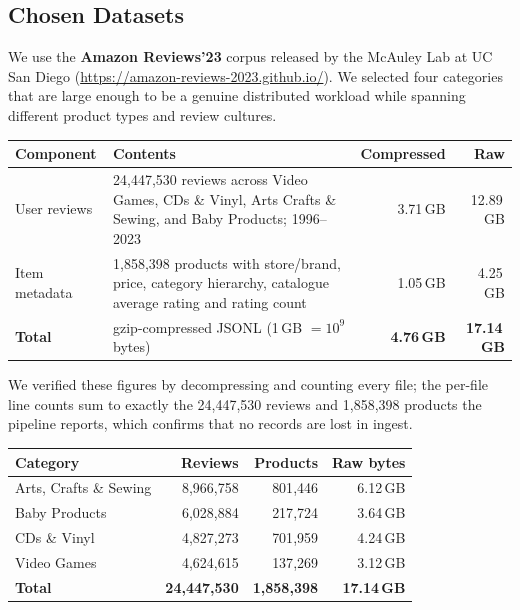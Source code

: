 \documentclass[12pt]{article}
\begin{document}
\subsection{Chosen Datasets}

We use the \textbf{Amazon Reviews'23} corpus released by the McAuley Lab at UC
San Diego (\url{https://amazon-reviews-2023.github.io/}). We selected four
categories that are large enough to be a genuine distributed workload while
spanning different product types and review cultures.

\begin{tabularx}{\textwidth}{@{}lXrr@{}}
  \toprule
  \textbf{Component} & \textbf{Contents} & \textbf{Compressed} & \textbf{Raw} \\
  \midrule
  User reviews &
    24{,}447{,}530 reviews across Video Games, CDs \& Vinyl, Arts Crafts \&
    Sewing, and Baby Products; 1996--2023 &
    3.71\,GB & 12.89\,GB \\
  Item metadata &
    1{,}858{,}398 products with store/brand, price, category hierarchy,
    catalogue average rating and rating count &
    1.05\,GB & 4.25\,GB \\
  \midrule
  \textbf{Total} & gzip-compressed JSONL (1\,GB $=10^9$ bytes)
    & \textbf{4.76\,GB} & \textbf{17.14\,GB} \\
  \bottomrule
\end{tabularx}

We verified these figures by decompressing and counting every file; the
per-file line counts sum to exactly the 24{,}447{,}530 reviews and
1{,}858{,}398 products the pipeline reports, which confirms that no records
are lost in ingest.

\begin{center}
\begin{tabular}{@{}lrrr@{}}
  \toprule
  \textbf{Category} & \textbf{Reviews} & \textbf{Products} &
  \textbf{Raw bytes} \\
  \midrule
  Arts, Crafts \& Sewing & 8{,}966{,}758 & 801{,}446 & 6.12\,GB \\
  Baby Products          & 6{,}028{,}884 & 217{,}724 & 3.64\,GB \\
  CDs \& Vinyl           & 4{,}827{,}273 & 701{,}959 & 4.24\,GB \\
  Video Games            & 4{,}624{,}615 & 137{,}269 & 3.12\,GB \\
  \midrule
  \textbf{Total}         & \textbf{24{,}447{,}530} & \textbf{1{,}858{,}398}
                         & \textbf{17.14\,GB} \\
  \bottomrule
\end{tabular}
\end{center}
\end{document}
